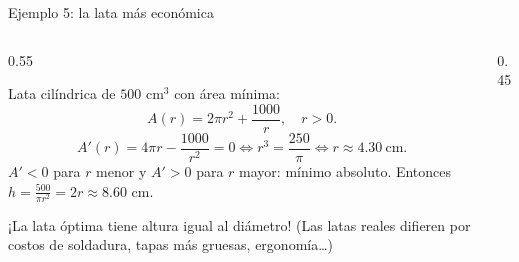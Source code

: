 \documentclass[10pt,aspectratio=169]{beamer}
\begin{document}
\begin{frame}{Ejemplo 5: la lata más económica}
  \begin{columns}
    \begin{column}{0.55\textwidth}
      \begin{ejemplo}
        Lata cilíndrica de $500$ cm$^3$ con área mínima:
        \[ A(r)=2\pi r^2+\frac{1000}{r},\quad r>0. \]
        \[ A'(r)=4\pi r-\frac{1000}{r^2}=0\iff r^3=\frac{250}{\pi}\iff r\approx4.30\ \text{cm}. \]
        $A'<0$ para $r$ menor y $A'>0$ para $r$ mayor: mínimo absoluto. Entonces $h=\frac{500}{\pi r^2}=2r\approx8.60$ cm.
      \end{ejemplo}
      \begin{idea}
        ¡La lata óptima tiene altura igual al diámetro! (Las latas reales difieren por costos de soldadura, tapas más gruesas, ergonomía\dots)
      \end{idea}
    \end{column}
    \begin{column}{0.45\textwidth}
      \centering
    \end{column}
  \end{columns}
\end{frame}
\end{document}
